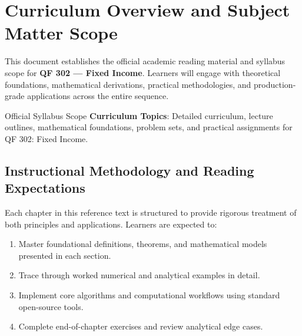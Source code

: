 \section{Curriculum Overview and Subject Matter Scope}

This document establishes the official academic reading material and syllabus scope for \textbf{QF 302 --- Fixed Income}. Learners will engage with theoretical foundations, mathematical derivations, practical methodologies, and production-grade applications across the entire sequence.

\begin{InsightBox}{Official Syllabus Scope}
  \textbf{Curriculum Topics}: Detailed curriculum, lecture outlines, mathematical foundations, problem sets, and practical assignments for QF 302: Fixed Income.
\end{InsightBox}

\subsection{Instructional Methodology and Reading Expectations}

Each chapter in this reference text is structured to provide rigorous treatment of both principles and applications. Learners are expected to:
\begin{enumerate}
  \item Master foundational definitions, theorems, and mathematical models presented in each section.
  \item Trace through worked numerical and analytical examples in detail.
  \item Implement core algorithms and computational workflows using standard open-source tools.
  \item Complete end-of-chapter exercises and review analytical edge cases.
\end{enumerate}


